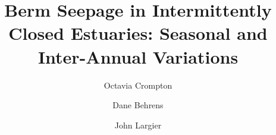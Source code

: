 \documentclass[preprint,12pt,authoryear]{elsarticle}
\begin{document}
\begin{frontmatter}



\title{ Berm Seepage in Intermittently Closed Estuaries: Seasonal and Inter-Annual Variations
}


\author[ars]{Octavia Crompton}

\author[epa]{Dane Behrens}

            
\author[bml]{John Largier}
            




\end{frontmatter}
\end{document}

